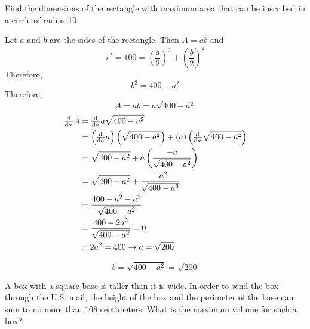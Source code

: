 \documentclass[a4paper, titlepage]{article}
\begin{document}
\begin{Exercise}
Find the dimensions of the rectangle with maximum area
that can be inscribed in a circle of radius 10.
\cite{anton-bivens-davis}
\end{Exercise}

\begin{Answer}
Let \(a\) and \(b\) are the sides of the rectangle. Then \(A = ab\) and
\[r^2 = 100 = \left( \frac{a}{2} \right)^2 + \left( \frac{b}{2} \right)^2\]
Therefore,
\[b^2 = 400 - a^2\]
Therefore,
\[A = ab = a \sqrt{400 - a^2}\]
\begin{align*}
    \od{}{a} A &= \od{}{a} a \sqrt{400 - a^2} \\
    &= \left( \od{}{a} a \right) \left( \sqrt{400 - a^2} \right)
      + \left( a \right) \left( \od{}{a} \sqrt{400 - a^2} \right) \\
    &= \sqrt{400 - a^2} + a \left(\frac{-a}{\sqrt{400 - a^2}} \right) \\
    &= \sqrt{400 - a^2} + \frac{-a^2}{\sqrt{400 - a^2}} \\
    &= \frac{400 - a^2 - a^2}{\sqrt{400 - a^2}} \\
    &= \frac{400 - 2a^2}{\sqrt{400 - a^2}} = 0 \\
    &\therefore 2a^2 = 400 \rightarrow a = \sqrt{200} \\
\end{align*}

\[b = \sqrt{400 - a^2} = \sqrt{200}\]
\end{Answer}

\begin{Exercise}
A box with a square base is taller than it is wide. In order
to send the box through the U.S. mail, the height of the box
and the perimeter of the base can sum to no more than 108
centimeters. What is the maximum volume for such a box?
\cite{anton-bivens-davis}
\end{Exercise}
\end{document}

